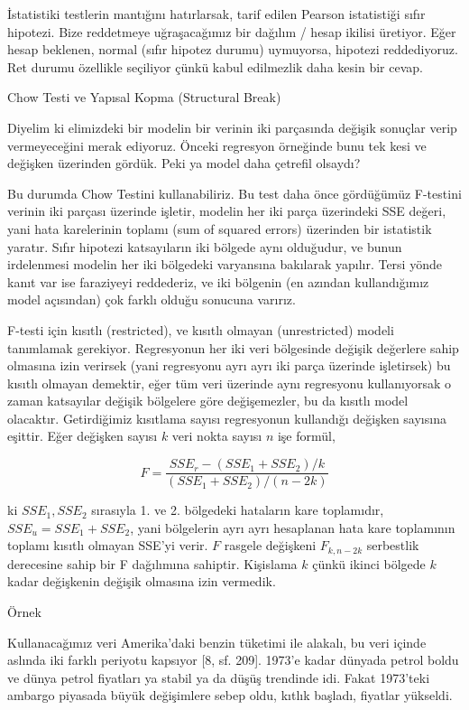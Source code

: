 \documentclass[12pt,fleqn]{article}\usepackage{../../common}
\begin{document}
İstatistiki testlerin mantığını hatırlarsak, tarif edilen Pearson
istatistiği sıfır hipotezi. Bize reddetmeye uğraşacağımız bir dağılım /
hesap ikilisi üretiyor. Eğer hesap beklenen, normal (sıfır hipotez durumu)
uymuyorsa, hipotezi reddediyoruz. Ret durumu özellikle seçiliyor çünkü
kabul edilmezlik daha kesin bir cevap. 

Chow Testi ve Yapısal Kopma (Structural Break)

Diyelim ki elimizdeki bir modelin bir verinin iki parçasında değişik
sonuçlar verip vermeyeceğini merak ediyoruz. Önceki regresyon örneğinde
bunu tek kesi ve değişken üzerinden gördük. Peki ya model daha çetrefil
olsaydı?

Bu durumda Chow Testini kullanabiliriz. Bu test daha önce gördüğümüz
F-testini verinin iki parçası üzerinde işletir, modelin her iki parça
üzerindeki SSE değeri, yani hata karelerinin toplamı (sum of squared
errors) üzerinden bir istatistik yaratır. Sıfır hipotezi katsayıların iki
bölgede aynı olduğudur, ve bunun irdelenmesi modelin her iki bölgedeki
varyansına bakılarak yapılır. Tersi yönde kanıt var ise faraziyeyi
reddederiz, ve iki bölgenin (en azından kullandığımız model açısından) çok
farklı olduğu sonucuna varırız.

F-testi için kısıtlı (restricted), ve kısıtlı olmayan (unrestricted) modeli
tanımlamak gerekiyor. Regresyonun her iki veri bölgesinde değişik değerlere
sahip olmasına izin verirsek (yani regresyonu ayrı ayrı iki parça üzerinde
işletirsek) bu kısıtlı olmayan demektir, eğer tüm veri üzerinde aynı
regresyonu kullanıyorsak o zaman katsayılar değişik bölgelere göre
değişemezler, bu da kısıtlı model olacaktır. Getirdiğimiz kısıtlama sayısı
regresyonun kullandığı değişken sayısına eşittir. Eğer değişken sayısı $k$
veri nokta sayısı $n$ işe formül,

$$ 
F = \frac{SSE_r - (SSE_1 + SSE_2) / k}{(SSE_1 + SSE_2) / (n-2k)}
 $$

ki $SSE_1,SSE_2$ sırasıyla 1. ve 2. bölgedeki hataların kare toplamıdır,
$SSE_u = SSE_1 + SSE_2$, yani bölgelerin ayrı ayrı hesaplanan hata kare
toplamının toplamı kısıtlı olmayan SSE'yi verir. $F$ rasgele değişkeni 
$F_{k,n-2k}$ serbestlik derecesine sahip bir F dağılımına
sahiptir. Kişislama $k$ çünkü ikinci bölgede $k$ kadar değişkenin değişik
olmasına izin vermedik.

Örnek

Kullanacağımız veri Amerika'daki benzin tüketimi ile alakalı, bu veri
içinde aslında iki farklı periyotu kapsıyor [8, sf. 209]. 1973'e kadar
dünyada petrol boldu ve dünya petrol fiyatları ya stabil ya da düşüş
trendinde idi. Fakat 1973'teki ambargo piyasada büyük değişimlere sebep
oldu, kıtlık başladı, fiyatlar yükseldi. 
\end{document}
